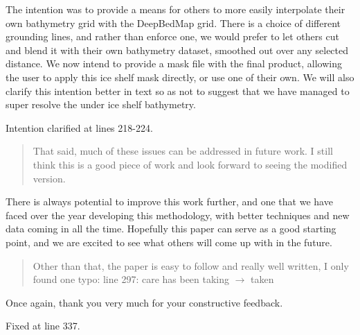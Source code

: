 \documentclass{article}
\begin{document}
The intention was to provide a means for others to more easily interpolate their own bathymetry grid with the DeepBedMap grid.
There is a choice of different grounding lines, and rather than enforce one, we would prefer to let others cut and blend it with their own bathymetry dataset, smoothed out over any selected distance.
We now intend to provide a mask file with the final product, allowing the user to apply this ice shelf mask directly, or use one of their own.
We will also clarify this intention better in text so as not to suggest that we have managed to super resolve the under ice shelf bathymetry.

{
  \color{ForestGreen}
   Intention clarified at lines 218-224.
}

\begin{quote}
\color{blue}
That said, much of these issues can be addressed in future work. I still think this is a good piece of work and look forward to seeing the modified version.
\end{quote}

There is always potential to improve this work further, and one that we have faced over the year developing this methodology, with better techniques and new data coming in all the time.
Hopefully this paper can serve as a good starting point, and we are excited to see what others will come up with in the future.


\begin{quote}
\color{blue}
Other than that, the paper is easy to follow and really well written, I only found one
typo:
 line 297: care has been taking $\rightarrow$ taken
\end{quote}

Once again, thank you very much for your constructive feedback.

{
  \color{ForestGreen}
   Fixed at line 337.
}

\printbibliography
\end{document}
